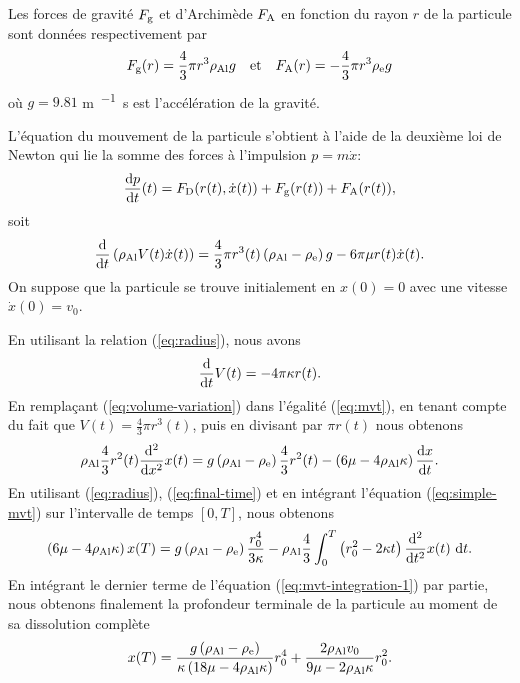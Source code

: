 Les forces de gravité $F_{\mathrm g}$ et d'Archimède $F_{\mathrm A}$
en fonction du rayon $r$ de la particule sont données respectivement
par
\begin{equation*}
F_{\mathrm g}(r) = \frac{4}{3}\pi r^3 \rho_\mathrm{Al} g
\quad\text{et}\quad
F_{\mathrm A}(r) = -\frac{4}{3}\pi r^3 \rho_\mathrm{e} g
\end{equation*}
où $g = 9.81$ \si{\meter\per\squared\second} est l'accélération de la gravité.

L'équation du mouvement de la particule s'obtient à l'aide de la
deuxième loi de Newton qui lie la somme des forces à l'impulsion $p =
m\dot x$:
\begin{equation*}
\frac{\mathrm dp}{\mathrm dt}(t) = F_{\mathrm D}(r(t), \dot x(t)) + F_{\mathrm g}(r(t)) + F_{\mathrm A}(r(t)),
\end{equation*}
soit
\begin{equation}\label{eq:mvt}
  \frac{\mathrm d}{\mathrm dt}\left( \rho_\mathrm{Al} V(t)\dot x(t) \right) =
  \frac{4}{3}\pi r^3(t)\left( \rho_\mathrm{Al} - \rho_\mathrm{e} \right)g -
  6\pi\mu r(t)\dot x(t).
\end{equation}
On suppose que la particule se trouve initialement en $x(0) = 0$ avec
une vitesse $\dot x(0) = v_0$.

En utilisant la relation (\ref{eq:radius}), nous avons
\begin{equation}\label{eq:volume-variation}
  \frac{\mathrm d}{\mathrm dt}V(t) = -4\pi \kappa r(t).
\end{equation}
En remplaçant (\ref{eq:volume-variation}) dans l'égalité
(\ref{eq:mvt}), en tenant compte du fait que $V(t) = \frac{4}{3}\pi
r^3(t)$, puis en divisant par $\pi r(t)$ nous obtenons
\begin{equation}\label{eq:simple-mvt}
\rho_\mathrm{Al} \frac{4}{3}r^2(t)\frac{\mathrm d^2}{\mathrm dx^2}x(t)
= g\left( \rho_\mathrm{Al} - \rho_\mathrm{e} \right)\frac{4}{3}r^2(t) -
\left( 6\mu - 4\rho_\mathrm{Al}
  \kappa \right)\frac{\mathrm dx}{\mathrm dt}.
\end{equation}
En utilisant (\ref{eq:radius}), (\ref{eq:final-time}) et en
intégrant l'équation (\ref{eq:simple-mvt}) sur l'intervalle de temps $[0, T]$, nous
obtenons
\begin{equation}\label{eq:mvt-integration-1}
\left( 6\mu - 4\rho_\mathrm{Al}\kappa \right)x(T)
= g\left( \rho_\mathrm{Al} -
  \rho_\mathrm{e} \right)\frac{r_0^4}{3\kappa}-\rho_\mathrm{Al}\frac{4}{3}\int_0^T\left( r_0^2
- 2\kappa t \right)\frac{\mathrm d^2}{\mathrm dt^2}x(t)\,\,\mathrm dt.
\end{equation}
En intégrant le dernier terme de l'équation
(\ref{eq:mvt-integration-1}) par partie, nous obtenons finalement la
profondeur terminale de la particule au moment de sa dissolution complète
\begin{equation}\label{eq:particle-terminal-position}
x(T) = \frac{g\left( \rho_\mathrm{Al} - \rho_\mathrm{e}
     \right)}{\kappa
  \left( 18\mu - 4\rho_\mathrm{Al}
    \kappa \right)}r_0^4 + \frac{2 \rho_\mathrm{Al}
  v_0}{9\mu - 2\rho_\mathrm{Al} \kappa} r_0^2.
\end{equation}

